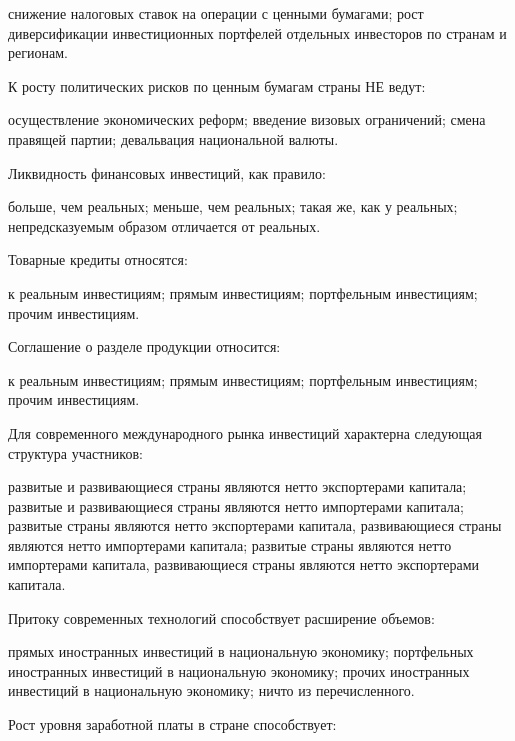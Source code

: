 \documentclass[12pt, table]{exam}
\begin{document}
\begin{questions}
\begin{multicols}{2}
\begin{choices}
	 \choice снижение налоговых ставок на операции с ценными бумагами;
	 \CC рост диверсификации инвестиционных портфелей отдельных инвесторов по странам и регионам.
	 \end{choices}
\question  К росту политических рисков по ценным бумагам страны НЕ ведут:
	 \begin{choices}
	 \choice осуществление экономических реформ;
	 \choice введение визовых ограничений;
	 \choice смена правящей партии;
	 \CC девальвация национальной валюты.
	 \end{choices}
\question  Ликвидность финансовых инвестиций, как правило:
	 \begin{choices}
	 \CC больше, чем реальных;
	 \choice меньше, чем реальных;
	 \choice такая же, как у реальных;
	 \choice непредсказуемым образом отличается от реальных.
	 \end{choices}
\question  Товарные кредиты относятся:
	 \begin{choices}
	 \CC к реальным инвестициям;
	 \choice прямым инвестициям;
	 \choice портфельным инвестициям;
	 \choice прочим инвестициям.
	 \end{choices}
\question  Соглашение о разделе продукции относится:
	 \begin{choices}
	 \choice к реальным инвестициям;
	 \CC прямым инвестициям;
	 \choice портфельным инвестициям;
	 \choice прочим инвестициям.
	 \end{choices}
\question  Для современного международного рынка инвестиций характерна следующая структура участников:
	 \begin{choices}
	 \choice развитые и развивающиеся страны являются нетто экспортерами капитала;
	 \choice развитые и развивающиеся страны являются нетто импортерами капитала;
	 \CC развитые страны являются нетто экспортерами капитала, развивающиеся страны являются нетто импортерами капитала;
	 \choice развитые страны являются нетто импортерами капитала, развивающиеся страны являются нетто экспортерами капитала.
	 \end{choices}
\question  Притоку современных технологий способствует расширение объемов:
	 \begin{choices}
	 \CC прямых иностранных инвестиций в национальную экономику;
	 \choice портфельных иностранных инвестиций в национальную экономику;
	 \choice прочих иностранных инвестиций в национальную экономику;
	 \choice ничто из перечисленного.
	 \end{choices}
\question  Рост уровня заработной платы в стране способствует:
	 \begin{choices}

\end{choices}
\end{multicols}
\end{questions}
\end{document}
